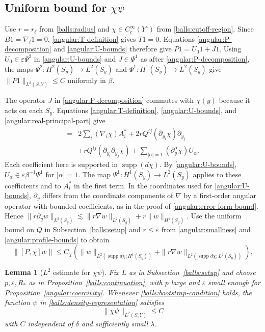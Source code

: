 \documentclass[11pt,a4paper]{article}
\newtheorem{lemma}[theorem]{Lemma}
\theoremstyle{definition}
\theoremstyle{remark}
\newcommand{\eps}{\varepsilon}
\DeclareMathOperator{\supp}{supp}
\numberwithin{equation}{section}
\begin{document}
\subsection{Uniform bound for \texorpdfstring{$\chi\psi$}{chi psi}}

Use $r=r_\delta$ from \eqref{balls:radius} and
$\chi\in C_c^\infty(Y^\circ)$ from \eqref{balls:cutoff-region}.
Since $B1=\nabla_i1=0$, \eqref{angular:T-definition} gives $T1=0$.
Equations \eqref{angular:P-decomposition} and
\eqref{angular:U-bounds} therefore give $P1=U_0 1+J1$.
Using $U_0\in\eps\Psi^2$ in \eqref{angular:U-bounds} and
$J\in\Psi^1$ as after \eqref{angular:P-decomposition}, the maps
$\Psi^2:H^2(S_y)\to L^2(S_y)$ and $\Psi^1:H^1(S_y)\to L^2(S_y)$
give $\|P1\|_{L^2(S_\gamma Y)}\le C$ uniformly in $\beta$.

The operator $J$ in \eqref{angular:P-decomposition} commutes with
$\chi(y)$ because it acts on each $S_y$. Equations
\eqref{angular:T-definition}, \eqref{angular:U-bounds}, and
\eqref{angular:real-principal-part} give
\begin{align*}
 [P,\chi]
 ={}&2\sum_i(\nabla_i\chi)A_i^*
      +2rQ^{ij}(\partial_{y_i}\chi)\partial_{y_j}\\
 &+rQ^{ij}(\partial_{y_i}\partial_{y_j}\chi)
      +\sum_{|\alpha|=1}(\partial_y^\alpha\chi)U_\alpha.
\end{align*}
Each coefficient here is supported in $\operatorname{supp}(d\chi)$.
By \eqref{angular:U-bounds}, $U_\alpha\in\eps\beta^{-1}\Psi^1$ for
$|\alpha|=1$. The map $\Psi^1:H^1(S_y)\to L^2(S_y)$ applies to
these coefficients and to $A_i^*$ in the first term. In the coordinates
used for \eqref{angular:U-bounds}, $\partial_y$ differs from the
coordinate components of $\nabla$ by a first-order angular operator
with bounded coefficients, as in the proof of
\eqref{angular:error-form-bound}. Hence
$\|r\partial_y w\|_{L^2(S_y)}\lesssim
\|r\nabla w\|_{L^2(S_y)}+r\|w\|_{H^1(S_y)}$.
Use the uniform bound on $Q$ in Subsection~\ref{balls:setup} and
$r\le\eps$ from \eqref{angular:smallness} and
\eqref{angular:profile-bounds} to obtain
\begin{equation}\label{angular:cutoff-bound}
 \|[P,\chi]w\|
 \le C_\chi\left(
  \|w\|_{L^2(\supp d\chi;H^1(S_y))}
    +\|r\nabla w\|_{L^2(\supp d\chi;L^2(S_y))}\right),
\end{equation}

\begin{lemma}[$L^2$ estimate for $\chi\psi$]\label{local:density}
Fix $L$ as in Subsection~\ref{balls:setup} and choose
$p,\varepsilon,R_*$ as in Proposition~\ref{balls:continuation},
with $p$ large and $\varepsilon$ small enough for
Proposition~\ref{angular:coercivity}. Whenever
\eqref{balls:bootstrap-condition} holds, the function $\psi$ in
\eqref{balls:density-representation} satisfies
\begin{equation}\label{local:density-bound}
 \|\chi\psi\|_{L^2(S_\gamma Y)}\leq C
\end{equation}
with $C$ independent of $\delta$ and sufficiently small $\lambda$.
\end{lemma}
\end{document}
